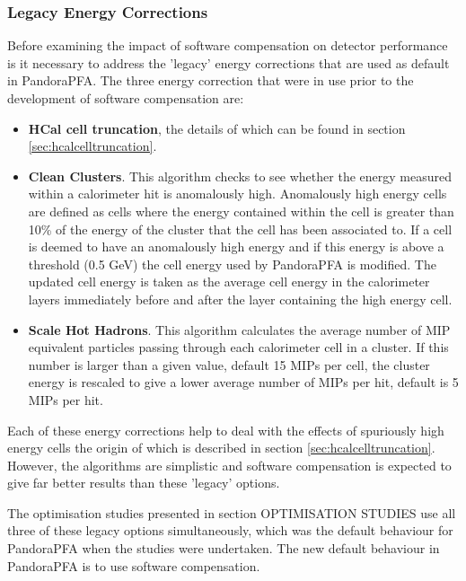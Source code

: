 \subsubsection{Legacy Energy Corrections}
\label{sec:legacycorrections}
Before examining the impact of software compensation on detector performance is it necessary to address the 'legacy' energy corrections that are used as default in PandoraPFA.  The three energy correction that were in use prior to the development of software compensation are:

\begin{itemize}
\item \textbf{HCal cell truncation}, the details of which can be found in section \ref{sec:hcalcelltruncation}.
\item \textbf{Clean Clusters}.  This algorithm checks to see whether the energy measured within a calorimeter hit is anomalously high.  Anomalously high energy cells are defined as cells where the energy contained within the cell is greater than 10\% of the energy of the cluster that the cell has been associated to.  If a cell is deemed to have an anomalously high energy and if this energy is above a threshold (0.5 GeV) the cell energy used by PandoraPFA is modified.  The updated cell energy is taken as the average cell energy in the calorimeter layers immediately before and after the layer containing the high energy cell.    
\item \textbf{Scale Hot Hadrons}.  This algorithm calculates the average number of MIP equivalent particles passing through each calorimeter cell in a cluster.  If this number is larger than a given value, default 15 MIPs per cell, the cluster energy is rescaled to give a lower average number of MIPs per hit, default is 5 MIPs per hit.  
\end{itemize}

Each of these energy corrections help to deal with the effects of spuriously high energy cells the origin of which is described in section \ref{sec:hcalcelltruncation}.  However, the algorithms are simplistic and software compensation is expected to give far better results than these 'legacy' options.  

The optimisation studies presented in section OPTIMISATION STUDIES use all three of these legacy options simultaneously, which was the default behaviour for PandoraPFA when the studies were undertaken.  The new default behaviour in PandoraPFA is to use software compensation.


